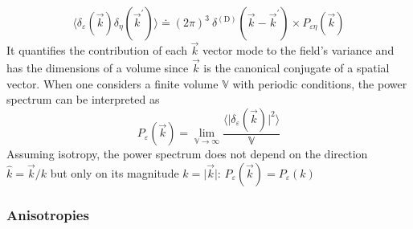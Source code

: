 \begin{equation}
\langle \delta_\varepsilon (\vec{k}) \delta_\eta (\vec{k}^\prime) \rangle \doteq (2 \pi)^3~\delta^{\mathrm{(D)}} (\vec{k} - \vec{k}^\prime) \times P_{\varepsilon \eta} (\vec{k})
\end{equation}  It quantifies the contribution of each $\vec{k}$ vector mode to the field's variance and has the dimensions of a volume since $\vec{k}$ is the canonical conjugate of a spatial vector. When one considers a finite volume $\mathbb{V}$ with periodic conditions, the power spectrum can be interpreted as 
\begin{equation}
P_\varepsilon (\vec{k}) = \lim_{\mathbb{V} \rightarrow \infty} \frac{\langle \vert \delta_\varepsilon (\vec{k}) \vert^2 \rangle}{\mathbb{V}}
\end{equation} Assuming isotropy, the power spectrum does not depend on the direction $\hat{k} = \vec{k}/k$ but only on its magnitude $k = \vert \vec{k} \vert$: $P_\varepsilon (\vec{k}) = P_\varepsilon(k)$\\

\subsubsection{Anisotropies}

